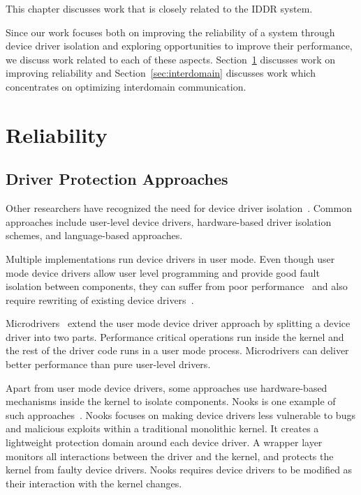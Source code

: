 This chapter discusses work that is closely related to the IDDR system. 

Since our work focuses both on improving the reliability of a system through
device driver isolation and exploring opportunities to improve their performance,
we discuss work related to each of these aspects.
Section~\ref{sec:robustness} discusses work on improving reliability and
Section~\ref{sec:interdomain} discusses work which concentrates on
optimizing interdomain communication.

\section{Reliability}
\label{sec:robustness}

\subsection{Driver Protection Approaches}
Other researchers have recognized the need for device driver 
isolation~\cite{tanenbaum2006can, coveritykernel}. 
Common approaches include user-level device drivers, hardware-based 
driver isolation schemes, and language-based approaches.

Multiple implementations run device drivers in user
mode. Even though user mode device drivers allow user level
programming and provide good fault isolation between components,
they can suffer from poor performance~\cite{armand1991give} and also
require rewriting of existing device drivers~\cite{Leslie+:jcst2005}.

Microdrivers~\cite{Ganapathy:2008:DIM:1346281.1346303} extend the
user mode device driver approach by splitting a device driver into two
parts. Performance critical operations run inside the kernel and 
the rest of the driver code runs in a user mode process. 
Microdrivers can deliver better performance than pure user-level drivers.

Apart from user mode device drivers, some approaches use 
hardware-based mechanisms inside the kernel to isolate components. Nooks
is one example of such approaches~\cite{swift2005improving}.  
Nooks focuses on making device drivers less vulnerable to bugs and
malicious exploits within a traditional monolithic kernel.
It creates a lightweight protection domain around each device driver. 
A wrapper layer monitors
all interactions between the driver and the kernel, and protects the
kernel from faulty device drivers. Nooks requires device drivers to be
modified as their interaction with the kernel changes.

